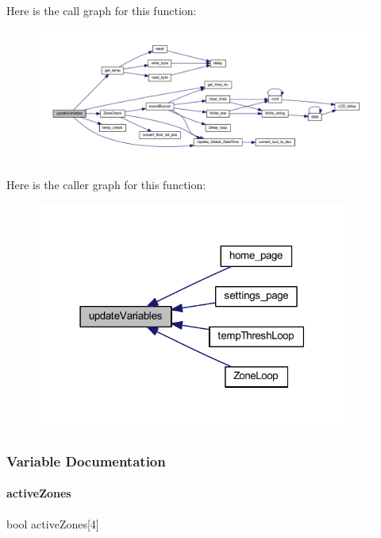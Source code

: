 Here is the call graph for this function\+:
\nopagebreak
\begin{figure}[H]
\begin{center}
\leavevmode
\includegraphics[width=350pt]{a00023_a77a749cc64c8c52f24cfa7d5a886435e_cgraph}
\end{center}
\end{figure}
Here is the caller graph for this function\+:
\nopagebreak
\begin{figure}[H]
\begin{center}
\leavevmode
\includegraphics[width=291pt]{a00023_a77a749cc64c8c52f24cfa7d5a886435e_icgraph}
\end{center}
\end{figure}


\subsubsection{Variable Documentation}
\mbox{\label{a00023_a0c777c89cc8b06ddc6c0176f2c31033f}} 
\paragraph{active\+Zones}
{\footnotesize\ttfamily bool active\+Zones[4]}


